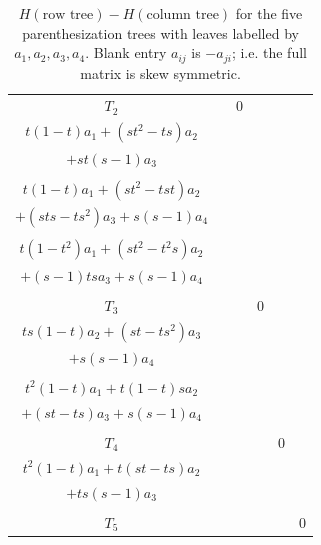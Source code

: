 \documentclass[11pt]{amsart}
\theoremstyle{definition}
\begin{document}
\begin{table}
{{\begin{tabular}{|c|c|c|c|c|c|}
    
    \hline
    $T_2$ & & 0 & \makecell{ \hspace{2pt} \\ $t(1-t)a_1 + (st^2 - ts)a_2 $ \\ $ + st(s - 1)a_3 $ \\ \hspace{2pt} } & \makecell{ \hspace{2pt} \\ $t(1 - t) a_1 + (st^2-tst)a_2  $ \\ $ + (sts-ts^2)a_3 + s(s - 1)a_4$ \\ \hspace{2pt} } & \makecell{ \hspace{2pt} \\ $t(1-t^2)a_1 + (st^2 -t^2 s)a_2  $ \\ $ + (s - 1)ts a_3 +s(s - 1) a_4$ \\ \hspace{2pt} } \\
    \hline
    $T_3$ & & & 0  & \makecell{ \hspace{2pt} \\ $ts(1 - t)a_2 +(st-ts^2)a_3  $ \\ $ +s(s-1)a_4 $ \\ \hspace{2pt} } & \makecell{ \hspace{2pt} \\ $t^2(1 - t)a_1 + t(1 - t) s a_2 $ \\ $ +(st - ts)a_3 + s(s - 1)a_4$ \\ \hspace{2pt} } \\
    \hline
    $T_4$ & & & & 0 & \makecell{ \hspace{2pt} \\ $t^2(1 - t)a_1 + t(st - t s)a_2 $ \\ $ + ts(s - 1)a_3 $ \\ \hspace{2pt} } \\
    \hline
    $T_5$ & & & & & 0 \\
    \hline
        \end{tabular}
      }%
    }%


    \caption{$H(\text{row tree}) - H(\text{column tree})$ for the five parenthesization trees with leaves labelled by $a_1, a_2, a_3, a_4$. Blank entry $a_{ij}$ is $-a_{ji}$; i.e. the full matrix is skew symmetric.}
    \end{table}
\end{document}

